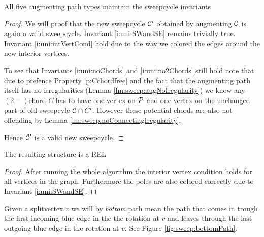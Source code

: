    \begin{lemma}
      All five augmenting path types maintain the sweepcycle invariants
    \end{lemma}
    \begin{proof}
      We will proof that the new sweepcycle $\C'$ obtained by augmenting $\C$ is again a valid sweepcycle. Invariant \ref{i:uni:SWandSE} remains trivially true. Invariant \ref{i:uni:intVertCond} hold due to the way we colored the edges around the new interior vertices.

      To see that Invariants \ref{i:uni:noChords} and \ref{i:uni:no2Chords} still hold note that due to prefence Property \ref{p:Cchordfree} and the fact that the augmenting path itself has no irregularities (Lemma \ref{lm:sweep:augNoIregularity})
      we know any $(2-)$chord $C$ has to have one vertex on $\P$ and one vertex on the unchanged part of old sweepcyle $\C \cap C'$. However these potential chords are also not offending by Lemma \ref{lm:sweep:noConnectingIregularity}.

      Hence $\C'$ is a valid new sweepcycle.
    \end{proof}

    \begin{lemma}
      \label{lm:sweep:REL}
      The resulting structure is a REL
    \end{lemma}

    \begin{proof}
      After running the whole algorithm the interior vertex condition holds for all vertices in the graph. Furthermore the poles are also colored correctly due to Invariant \ref{i:uni:SWandSE}.
    \end{proof}

    Given a splitvertex $v$ we will by \emph{bottom} path mean the path that comes in trough the first incoming blue edge in the the rotation at $v$ and leaves through the last outgoing blue edge in the rotation at $v$. See Figure \ref{fig:sweep:bottomPath}.

